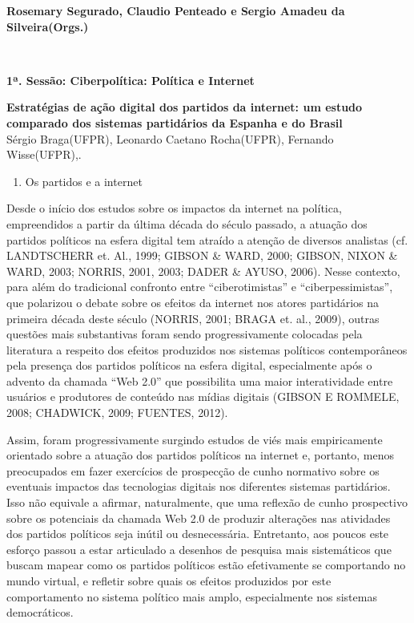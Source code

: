 \textbf{Rosemary Segurado, Claudio Penteado e Sergio Amadeu da
Silveira(Orgs.)}

\textbf{\\
}

\textbf{1ª. Sessão: Ciberpolítica: Política e Internet}

\textbf{Estratégias de ação digital dos partidos da internet: um estudo
comparado dos sistemas partidários da Espanha e do Brasil}\\
Sérgio Braga(UFPR), Leonardo Caetano Rocha(UFPR), Fernando Wisse(UFPR),.

\begin{enumerate}
\def\labelenumi{\arabic{enumi})}
\item
  Os partidos e a internet
\end{enumerate}

Desde o início dos estudos sobre os impactos da internet na política,
empreendidos a partir da última década do século passado, a atuação dos
partidos políticos na esfera digital tem atraído a atenção de diversos
analistas (cf. LANDTSCHERR et. Al., 1999; GIBSON \& WARD, 2000; GIBSON,
NIXON \& WARD, 2003; NORRIS, 2001, 2003; DADER \& AYUSO, 2006). Nesse
contexto, para além do tradicional confronto entre ``ciberotimistas'' e
``ciberpessimistas'', que polarizou o debate sobre os efeitos da
internet nos atores partidários na primeira década deste século (NORRIS,
2001; BRAGA et. al., 2009), outras questões mais substantivas foram
sendo progressivamente colocadas pela literatura a respeito dos efeitos
produzidos nos sistemas políticos contemporâneos pela presença dos
partidos políticos na esfera digital, especialmente após o advento da
chamada ``Web 2.0'' que possibilita uma maior interatividade entre
usuários e produtores de conteúdo nas mídias digitais (GIBSON E ROMMELE,
2008; CHADWICK, 2009; FUENTES, 2012).

Assim, foram progressivamente surgindo estudos de viés mais
empiricamente orientado sobre a atuação dos partidos políticos na
internet e, portanto, menos preocupados em fazer exercícios de
prospecção de cunho normativo sobre os eventuais impactos das
tecnologias digitais nos diferentes sistemas partidários. Isso não
equivale a afirmar, naturalmente, que uma reflexão de cunho prospectivo
sobre os potenciais da chamada Web 2.0 de produzir alterações nas
atividades dos partidos políticos seja inútil ou desnecessária.
Entretanto, aos poucos este esforço passou a estar articulado a desenhos
de pesquisa mais sistemáticos que buscam mapear como os partidos
políticos estão efetivamente se comportando no mundo virtual, e refletir
sobre quais os efeitos produzidos por este comportamento no sistema
político mais amplo, especialmente nos sistemas democráticos.

